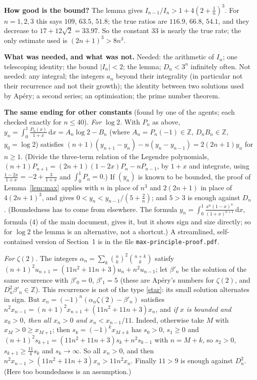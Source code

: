 \documentclass[11pt]{article}
\newcommand{\Z}{\mathbb Z}
\newcommand{\dd}{\,\mathrm d}
\newcommand{\q}[1]{\medskip\noindent\textbf{#1}}
\begin{document}
\q{How good is the bound?} The lemma gives $I_{n-1}/I_n>1+4(2+\frac1n)^3$. For $n=1,2,3$ this says
$109$, $63.5$, $51.8$; the true ratios are $116.9$, $66.8$, $54.1$, and they decrease to
$17+12\sqrt2=33.97$. So the constant $33$ is nearly the true rate; the only estimate used is
$(2n+1)^3>8n^3$.

\q{What was needed, and what was not.} Needed: the arithmetic of $I_n$; one telescoping identity;
the bound $|I_n|<2$; the lemma; $D_n<3^n$ infinitely often. Not needed: any integral; the integers
$a_n$ beyond their integrality (in particular not their recurrence and not their growth); the
identity between two solutions used by Ap\'ery; a second series; an optimisation; the prime number
theorem.

\q{The same ending for other constants} (found by one of the agents; each checked exactly for
$n\le40$). \emph{For $\log2$.} With $P_n$ as above,
$y_n=\int_0^1\frac{P_n(x)}{1+x}\dd x=A_n\log2-B_n$ (where $A_n=P_n(-1)\in\Z$, $D_nB_n\in\Z$,
$y_0=\log2$) satisfies $(n+1)(y_{n+1}-y_n)-n(y_n-y_{n-1})=2(2n+1)y_n$ for $n\ge1$. (Divide the
three-term relation of the Legendre polynomials, $(n+1)P_{n+1}=(2n+1)(1-2x)P_n-nP_{n-1}$, by $1+x$
and integrate, using $\frac{1-2x}{1+x}=-2+\frac3{1+x}$ and $\int_0^1P_n=0$.) If $(y_n)$ is known to
be bounded, the proof of Lemma~\ref{lem:max} applies with $n$ in place of $n^3$ and $2(2n+1)$ in
place of $4(2n+1)^3$, and gives $0<y_n<y_{n-1}/(5+\frac2n)$; and $5>3$ is enough against $D_n$.
(Boundedness has to come from elsewhere. The formula
$y_n=\int_0^1\frac{x^n(1-x)^n}{(1+x)^{n+1}}\dd x$, formula (4) of the main document, gives it, but
it shows sign and size directly; so for $\log2$ the lemma is an alternative, not a shortcut.)
A streamlined, self-contained version of Section~1 is in the file \texttt{max-principle-proof.pdf}.

\emph{For $\zeta(2)$.} The integers $\alpha_n=\sum_k\binom nk^2\binom{n+k}k$ satisfy
$(n+1)^2u_{n+1}=(11n^2+11n+3)u_n+n^2u_{n-1}$; let $\beta'_n$ be the solution of the same recurrence
with $\beta'_0=0$, $\beta'_1=5$ (these are Ap\'ery's numbers for $\zeta(2)$, and
$D_n^2\beta'_n\in\Z$). This recurrence is not of the
type \eqref{star}: its small solution alternates in sign. But
$x_n=(-1)^n(\alpha_n\zeta(2)-\beta'_n)$ satisfies $n^2x_{n-1}=(n+1)^2x_{n+1}+(11n^2+11n+3)x_n$, and
\emph{if $x$ is bounded and $x_0>0$, then all $x_n>0$ and $x_n<x_{n-1}/11$}. Indeed, otherwise take
$M$ with $x_M>0\ge x_{M+1}$; then $s_k=(-1)^kx_{M+k}$ has $s_0>0$, $s_1\ge0$ and
$(n+1)^2s_{k+1}=(11n^2+11n+3)s_k+n^2s_{k-1}$ with $n=M+k$, so $s_2>0$, $s_{k+1}\ge\frac{11}4s_k$ and
$s_k\to\infty$. So all $x_n>0$, and then $n^2x_{n-1}>(11n^2+11n+3)x_n>11n^2x_n$. Finally $11>9$ is
enough against $D_n^2$. (Here too boundedness is an assumption.)
\end{document}
